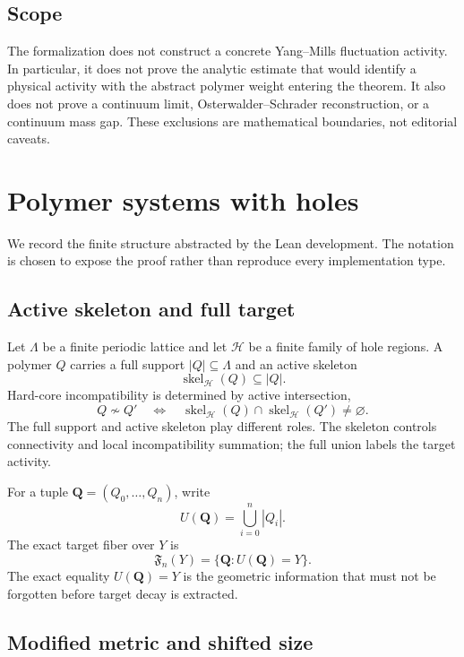 \documentclass[11pt]{article}
\newcommand{\skel}{\operatorname{skel}}
\newcommand{\incomp}{\not\sim}
\begin{document}
\subsection{Scope}

The formalization does not construct a concrete Yang--Mills fluctuation activity.  In particular, it does not prove the analytic estimate that would identify a physical activity with the abstract polymer weight entering the theorem.  It also does not prove a continuum limit, Osterwalder--Schrader reconstruction, or a continuum mass gap.  These exclusions are mathematical boundaries, not editorial caveats.

\section{Polymer systems with holes}

We record the finite structure abstracted by the Lean development.  The notation is chosen to expose the proof rather than reproduce every implementation type.

\subsection{Active skeleton and full target}

Let $\Lambda$ be a finite periodic lattice and let $\mathcal H$ be a finite family of hole regions.  A polymer $Q$ carries a full support $|Q|\subseteq\Lambda$ and an active skeleton
\[
  \skel_{\mathcal H}(Q)\subseteq |Q|.
\]
Hard-core incompatibility is determined by active intersection,
\[
  Q\incomp Q'
  \quad\Longleftrightarrow\quad
  \skel_{\mathcal H}(Q)\cap\skel_{\mathcal H}(Q')\ne\varnothing.
\]
The full support and active skeleton play different roles.  The skeleton controls connectivity and local incompatibility summation; the full union labels the target activity.

For a tuple $\mathbf Q=(Q_0,\dots,Q_n)$, write
\[
  U(\mathbf Q)=\bigcup_{i=0}^{n}|Q_i|.
\]
The exact target fiber over $Y$ is
\[
  \mathfrak F_n(Y)
  =\{\mathbf Q:U(\mathbf Q)=Y\}.
\]
The exact equality $U(\mathbf Q)=Y$ is the geometric information that must not be forgotten before target decay is extracted.

\subsection{Modified metric and shifted size}
\end{document}
